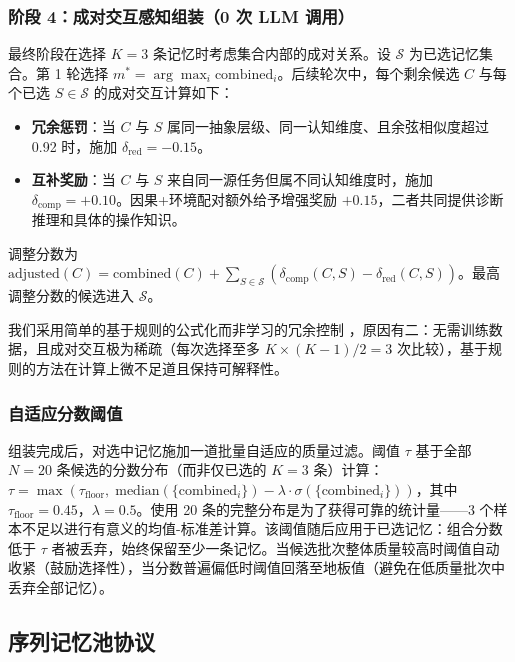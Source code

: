 \documentclass[UTF8,twocolumn]{ctexart}
\begin{document}
\subsubsection{阶段 4：成对交互感知组装（0 次 LLM 调用）}

最终阶段在选择 $K=3$ 条记忆时考虑集合内部的成对关系。设 $\mathcal{S}$ 为已选记忆集合。第 1 轮选择 $m^* = \arg\max_i \text{combined}_i$。后续轮次中，每个剩余候选 $C$ 与每个已选 $S \in \mathcal{S}$ 的成对交互计算如下：

\begin{itemize}
    \item \textbf{冗余惩罚}：当 $C$ 与 $S$ 属同一抽象层级、同一认知维度、且余弦相似度超过 0.92 时，施加 $\delta_{\text{red}} = -0.15$。
    \item \textbf{互补奖励}：当 $C$ 与 $S$ 来自同一源任务但属不同认知维度时，施加 $\delta_{\text{comp}} = +0.10$。因果+环境配对额外给予增强奖励 $+0.15$，二者共同提供诊断推理和具体的操作知识。
\end{itemize}

调整分数为 $\text{adjusted}(C) = \text{combined}(C) + \sum_{S \in \mathcal{S}} (\delta_{\text{comp}}(C, S) - \delta_{\text{red}}(C, S))$。最高调整分数的候选进入 $\mathcal{S}$。

我们采用简单的基于规则的公式化而非学习的冗余控制 \cite{context-picker, memfly}，原因有二：无需训练数据，且成对交互极为稀疏（每次选择至多 $K \times (K-1)/2 = 3$ 次比较），基于规则的方法在计算上微不足道且保持可解释性。

\subsubsection{自适应分数阈值}

组装完成后，对选中记忆施加一道批量自适应的质量过滤。阈值 $\tau$ 基于全部 $N=20$ 条候选的分数分布（而非仅已选的 $K=3$ 条）计算：$\tau = \max(\tau_{\text{floor}},\; \text{median}(\{\text{combined}_i\}) - \lambda \cdot \sigma(\{\text{combined}_i\}))$，其中 $\tau_{\text{floor}} = 0.45$，$\lambda = 0.5$。使用 20 条的完整分布是为了获得可靠的统计量——3 个样本不足以进行有意义的均值-标准差计算。该阈值随后应用于已选记忆：组合分数低于 $\tau$ 者被丢弃，始终保留至少一条记忆。当候选批次整体质量较高时阈值自动收紧（鼓励选择性），当分数普遍偏低时阈值回落至地板值（避免在低质量批次中丢弃全部记忆）。

\subsection{序列记忆池协议}
\label{sec:pool-cn}
\end{document}
